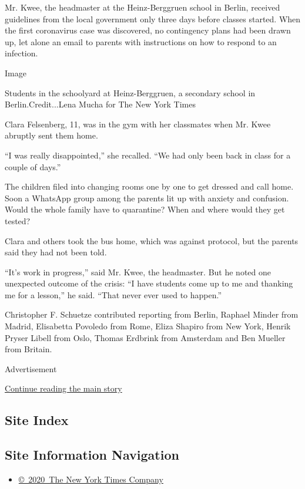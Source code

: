 Mr. Kwee, the headmaster at the Heinz-Berggruen school in Berlin,
received guidelines from the local government only three days before
classes started. When the first coronavirus case was discovered, no
contingency plans had been drawn up, let alone an email to parents with
instructions on how to respond to an infection.

Image

Students in the schoolyard at Heinz-Berggruen, a secondary school in
Berlin.Credit...Lena Mucha for The New York Times

Clara Felsenberg, 11, was in the gym with her classmates when Mr. Kwee
abruptly sent them home.

``I was really disappointed,'' she recalled. ``We had only been back in
class for a couple of days.''

The children filed into changing rooms one by one to get dressed and
call home. Soon a WhatsApp group among the parents lit up with anxiety
and confusion. Would the whole family have to quarantine? When and where
would they get tested?

Clara and others took the bus home, which was against protocol, but the
parents said they had not been told.

``It's work in progress,'' said Mr. Kwee, the headmaster. But he noted
one unexpected outcome of the crisis: ``I have students come up to me
and thanking me for a lesson,'' he said. ``That never ever used to
happen.''

Christopher F. Schuetze contributed reporting from Berlin, Raphael
Minder from Madrid, Elisabetta Povoledo from Rome, Eliza Shapiro from
New York, Henrik Pryser Libell from Oslo, Thomas Erdbrink from Amsterdam
and Ben Mueller from Britain.

Advertisement

\protect\hyperlink{after-bottom}{Continue reading the main story}

\hypertarget{site-index}{%
\subsection{Site Index}\label{site-index}}

\hypertarget{site-information-navigation}{%
\subsection{Site Information
Navigation}\label{site-information-navigation}}

\begin{itemize}
\tightlist
\item
  \href{https://help.nytimes3xbfgragh.onion/hc/en-us/articles/115014792127-Copyright-notice}{©~2020~The
  New York Times Company}
\end{itemize}

